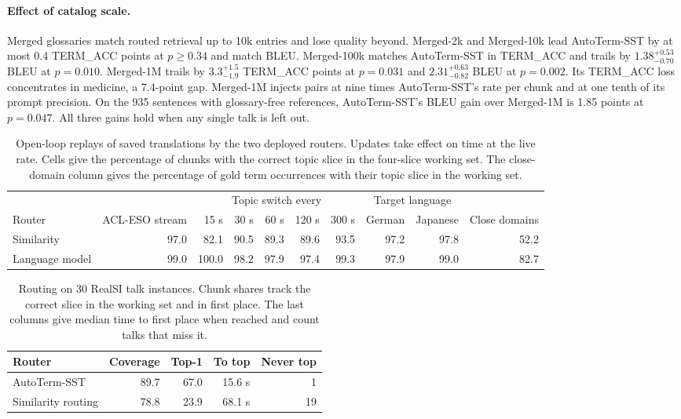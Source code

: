\paragraph{Effect of catalog scale.}
Merged glossaries match routed retrieval up to 10k entries and lose quality beyond. Merged-2k and Merged-10k
lead AutoTerm-SST by at most 0.4 TERM\_ACC points at $p\ge0.34$ and match BLEU.
Merged-100k matches AutoTerm-SST in TERM\_ACC and trails by
$1.38^{+0.53}_{-0.70}$ BLEU at $p=0.010$. Merged-1M trails by
$3.3^{+1.5}_{-1.9}$ TERM\_ACC points at $p=0.031$ and $2.31^{+0.63}_{-0.82}$ BLEU at
$p=0.002$. Its TERM\_ACC loss concentrates in medicine, a 7.4-point gap.
Merged-1M injects pairs at nine times AutoTerm-SST's rate per chunk and at one
tenth of its prompt precision. On the 935 sentences with glossary-free references,
AutoTerm-SST's BLEU gain over Merged-1M is 1.85 points at $p=0.047$. All three gains hold when any single talk is left out.

\begin{table}[t]
\centering
\small
\begin{tabular}{lrrrrrrrrr}
\toprule
& & \multicolumn{5}{c}{Topic switch every} & \multicolumn{2}{c}{Target language} & \\
\cmidrule(lr){3-7}\cmidrule(lr){8-9}
Router & ACL-ESO stream & 15 s & 30 s & 60 s & 120 s & 300 s & German & Japanese & Close domains \\
\midrule
Similarity & 97.0 & 82.1 & 90.5 & 89.3 & 89.6 & 93.5 & 97.2 & 97.8 & 52.2 \\
Language model & 99.0 & 100.0 & 98.2 & 97.9 & 97.4 & 99.3 & 97.9 & 99.0 & 82.7 \\
\bottomrule
\end{tabular}
\caption{Open-loop replays of saved translations by the two deployed routers. Updates
take effect on time at the live rate. Cells give the percentage of chunks with the
correct topic slice in the four-slice working set. The close-domain column gives the
percentage of gold term occurrences with their topic slice in the working set.}
\label{tab:router-diag}
\end{table}

\begin{table}[t]
\centering
\small
\setlength{\tabcolsep}{4pt}
\begin{tabular}{lrrrr}
\toprule
Router & Coverage & Top-1 & To top & Never top \\
\midrule
AutoTerm-SST & 89.7 & 67.0 & 15.6 s & 1 \\
Similarity routing & 78.8 & 23.9 & 68.1 s & 19 \\
\bottomrule
\end{tabular}
\caption{Routing on 30 RealSI talk instances. Chunk shares track the correct
slice in the working set and in first place. The last columns give median time
to first place when reached and count talks that miss it.}
\label{tab:realsi}
\end{table}

